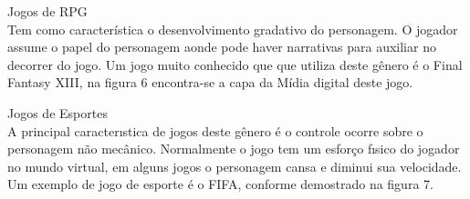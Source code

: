 \begin{alineascomponto}
\item Jogos de RPG\\
Tem como característica o desenvolvimento gradativo do personagem. O jogador assume o papel do personagem aonde pode haver narrativas para auxiliar no decorrer do jogo.
Um jogo muito conhecido que que utiliza deste gênero é o Final Fantasy XIII,  na figura 6 encontra-se a capa da Mídia digital deste jogo.
\end{alineascomponto}

\begin{figure}[h!]
		\centering
	\end{figure}
	
\begin{alineascomponto}
\item Jogos de Esportes\\
A principal caracterıstica de jogos deste gênero é o controle ocorre sobre o personagem não mecânico. Normalmente o jogo tem um esforço fısico do jogador no
mundo virtual, em alguns jogos o personagem cansa e diminui sua velocidade. Um exemplo de jogo de esporte é o FIFA, conforme demostrado na figura 7.
\end{alineascomponto}
\begin{figure}[h!]
		\centering
	\end{figure}

